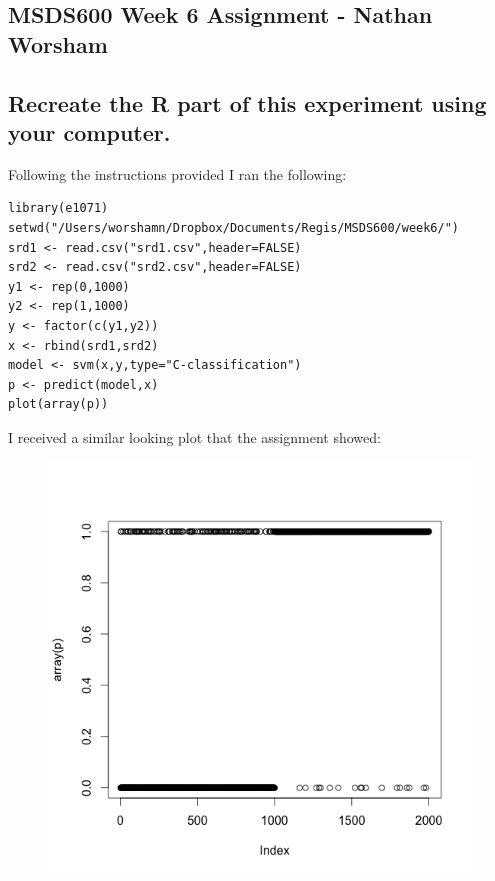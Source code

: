 \documentclass[10pt]{article}
\begin{document}
\subsection*{MSDS600 Week 6 Assignment - Nathan Worsham}
\subsection*{Recreate the R part of this experiment using your computer.}  
Following the instructions provided I ran the following: 
\begin{verbatim}
library(e1071) 
setwd("/Users/worshamn/Dropbox/Documents/Regis/MSDS600/week6/") 
srd1 <- read.csv("srd1.csv",header=FALSE) 
srd2 <- read.csv("srd2.csv",header=FALSE) 
y1 <- rep(0,1000) 
y2 <- rep(1,1000) 
y <- factor(c(y1,y2)) 
x <- rbind(srd1,srd2) 
model <- svm(x,y,type="C-classification") 
p <- predict(model,x) 
plot(array(p)) 
\end{verbatim}
I received a similar looking plot that the assignment showed: 
\begin{figure}[!h]
\includegraphics[scale=0.37]{Rplot_sd1v2.png}
\centering
\end{figure}
\end{document}
